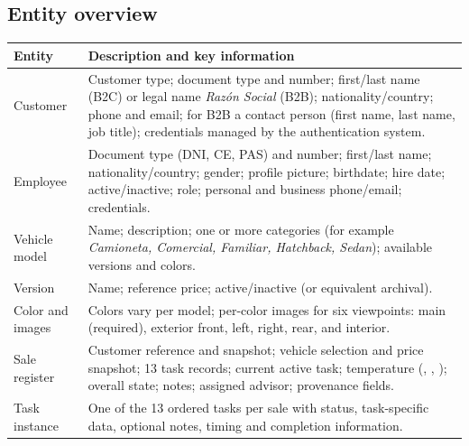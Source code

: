 \documentclass[11pt,a4paper]{article}
\newcommand{\code}[1]{\texttt{\detokenize{#1}}}
\begin{document}
\subsection{Entity overview}

\begin{longtable}{@{}L{3.2cm}L{12.6cm}@{}}
	\toprule
	\textbf{Entity}      & \textbf{Description and key information}                                                                                                                                                                                                                     \\
	\midrule
	\endhead
	Customer             & Customer type; document type and number; first/last name (B2C) or legal name \emph{Razón Social} (B2B); nationality/country; phone and email; for B2B a contact person (first name, last name, job title); credentials managed by the authentication system. \\
	Employee             & Document type (DNI, CE, PAS) and number; first/last name; nationality/country; gender; profile picture; birthdate; hire date; active/inactive; role; personal and business phone/email; credentials.                                                         \\
	Vehicle model        & Name; description; one or more categories (for example \emph{Camioneta, Comercial, Familiar, Hatchback, Sedan}); available versions and colors.                                                                                                              \\
	Version              & Name; reference price; active/inactive (or equivalent archival).                                                                                                                                                                                             \\
	Color and images     & Colors vary per model; per-color images for six viewpoints: main (required), exterior front, left, right, rear, and interior.                                                                                                                                \\
	Sale register        & Customer reference and snapshot; vehicle selection and price snapshot; 13 task records; current active task; temperature (\code{Hot}, \code{Warm}, \code{Cold}); overall state; notes; assigned advisor; provenance fields.                                  \\
	Task instance        & One of the 13 ordered tasks per sale with status, task-specific data, optional notes, timing and completion information.                                                                                                                                     \\

\end{longtable}
\end{document}
